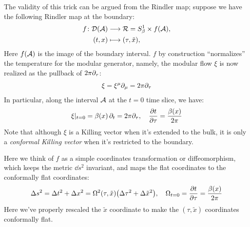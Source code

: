 \documentclass[11pt,a4paper]{article}
\begin{document}
	The validity of this trick can be argued from the Rindler map; suppose we have the following Rindler map at the boundary:
	\begin{equation}
	\begin{aligned}
		f\colon
		\mathcal{D}(\mathcal{A})
		&\longrightarrow \mathcal{R} = S^1_\beta \times f(\mathcal{A}), \\
		(t,x)
		&\longmapsto (\tau,\tilde{x}),
	\end{aligned}
	\end{equation}
	Here $f(\mathcal{A})$ is the image of the boundary interval. $f$ by construction ``normalizes'' the temperature for the modular generator, namely, the modular flow $\xi$ is now realized as the pullback of $2\pi\partial_{\tau}$:
	\begin{equation}
		\xi = \xi^\mu \partial_{\mu}
		= 2\pi\partial_{\tau}
	\end{equation}
	In particular, along the interval $\mathcal{A}$ at the $t = 0$ time slice, we have:
	\begin{equation}
		\xi|_{t = 0}
		= \beta(x)\,\partial_{t}
		= 2\pi\partial_{\tau},
	\quad
		\pdv{t}{\tau}
		= \frac{\beta(x)}{2\pi}
	\end{equation}
	Note that although $\xi$ is a Killing vector when it's extended to the bulk, it is only a \textit{conformal Killing vector} when it's restricted to the boundary. 
	
	Here we think of $f$ as a simple coordinates transformation or diffeomorphism, which keeps the metric $\dd{s}^2$ invariant, and maps the flat coordinates to the conformally flat coordinates:
	\begin{equation}
		\dd{s}^2
		= \dd{t}^2 + \dd{x}^2
		= \Omega^2(\tau,\tilde{x}) \pqty{
				\dd{\tau}^2 + \dd{\tilde{x}}^2
			},
	\quad
		\Omega_{t = 0} = \pdv{t}{\tau}
		= \frac{\beta(x)}{2\pi}
	\end{equation}
	Here we've properly rescaled the $\tilde{x}$ coordinate to make the $(\tau,\tilde{x})$ coordinates conformally flat. 
	
\end{document}

